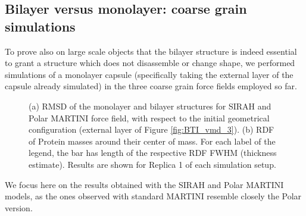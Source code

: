 \subsection{Bilayer versus monolayer: coarse grain simulations}
To prove also on large scale objects that the bilayer structure is indeed essential to grant a structure which does not disassemble or change shape, we performed simulations of a monolayer capsule (specifically taking the external layer of the capsule already simulated) in the three coarse grain force fields employed so far.
%
\begin{figure}[h!]
    \caption[Comparison of monolayer and bilayer structural properties]{(a) RMSD of the monolayer and bilayer structures for SIRAH and Polar MARTINI force field, with respect to the initial geometrical configuration (external layer of Figure \ref{fig:BTI_vmd_3}). (b) RDF of Protein masses around their center of mass. For each label of the legend, the bar has length of the respective RDF FWHM (thickness estimate). Results are shown for Replica 1 of each simulation setup.}
\label{fig:mono_bi}
\end{figure}
We focus here on the results obtained with the SIRAH and Polar MARTINI models, as the ones observed with standard MARTINI resemble closely the Polar version.

